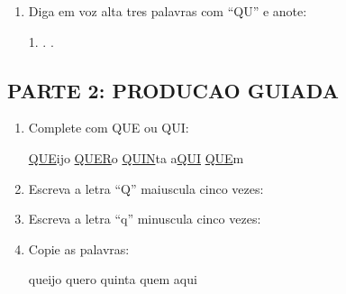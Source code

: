 \begin{exercicio}
\begin{enumerate}
  \item Diga em voz alta tres palavras com ``QU'' e anote:
  \begin{center}
  1. \underline{\hspace{4cm}} . \underline{\hspace{4cm}} . \underline{\hspace{4cm}}
  \end{center}
\end{enumerate}

\subsection*{PARTE 2: PRODUCAO GUIADA}

\begin{enumerate}[resume]
  \item Complete com QUE ou QUI:
  \begin{center}
  \underline{QUE}ijo \quad \underline{QUER}o \quad \underline{QUIN}ta \quad a\underline{QUI} \quad \underline{QUE}m
  \end{center}

  \item Escreva a letra ``Q'' maiuscula cinco vezes:
  \begin{center}
  \underline{\hspace{1.5cm}} \quad \underline{\hspace{1.5cm}} \quad \underline{\hspace{1.5cm}} \quad \underline{\hspace{1.5cm}} \quad \underline{\hspace{1.5cm}}
  \end{center}

  \item Escreva a letra ``q'' minuscula cinco vezes:
  \begin{center}
  \underline{\hspace{1.5cm}} \quad \underline{\hspace{1.5cm}} \quad \underline{\hspace{1.5cm}} \quad \underline{\hspace{1.5cm}} \quad \underline{\hspace{1.5cm}}
  \end{center}

  \item Copie as palavras:
  \begin{center}
  queijo \quad quero \quad quinta \quad quem \quad aqui
  \end{center}


\end{enumerate}
\end{exercicio}
